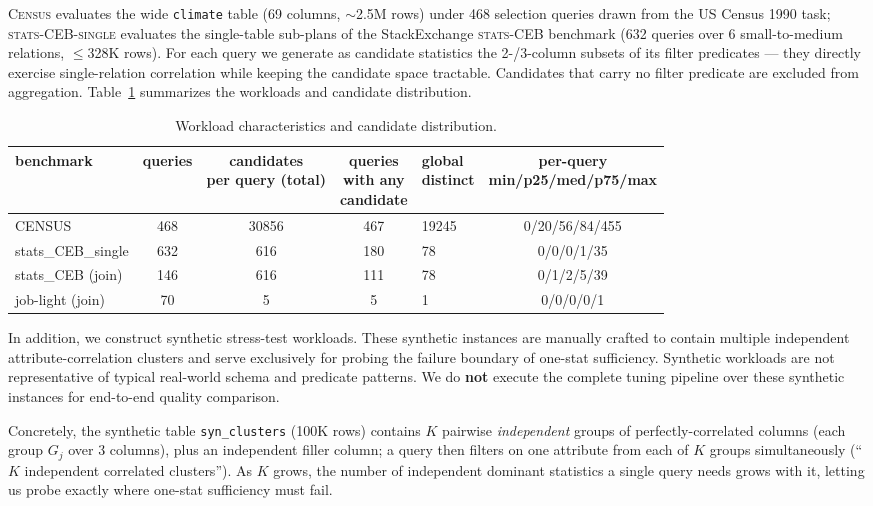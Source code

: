 \documentclass[sigconf, nonacm]{acmart}
\begin{document}
\textsc{Census} evaluates the wide \texttt{climate} table (69 columns,
$\sim$2.5M rows) under 468 selection queries drawn from the US Census 1990 task;
\textsc{stats-CEB-single} evaluates the single-table sub-plans of the
StackExchange \textsc{stats-CEB} benchmark (632 queries over 6 small-to-medium
relations, $\le$328K rows). For each query we generate as candidate statistics
the 2-/3-column subsets of its filter predicates --- they directly exercise
single-relation correlation while keeping the candidate space tractable.
Candidates that carry no filter predicate are excluded from aggregation.
Table~\ref{tab:bench} summarizes the workloads and candidate distribution.

\begin{table}[t]
\caption{Workload characteristics and candidate distribution.}
\label{tab:bench}
\small
\begin{tabular}{lcccl@{\hskip 3pt}c}
\toprule
benchmark & queries & \shortstack[c]{candidates\\per query (total)} & \shortstack[c]{queries\\with any\\candidate} & \shortstack[c]{global\\distinct} & \shortstack[c]{per-query\\min/p25/med/p75/max} \\
\midrule
CENSUS            & 468 & 30856 & 467 & 19245 & 0/20/56/84/455\\
stats\_CEB\_single & 632 & 616   & 180 & 78    & 0/0/0/1/35\\
stats\_CEB (join) & 146 & 616   & 111 & 78    & 0/1/2/5/39\\
job-light (join)  & 70  & 5     & 5   & 1     & 0/0/0/0/1\\
\bottomrule
\end{tabular}
\end{table}

In addition, we construct synthetic stress-test workloads. These synthetic instances are manually crafted to contain multiple independent attribute-correlation clusters and serve exclusively for probing the failure boundary of one-stat sufficiency.
Synthetic workloads are not representative of typical real-world schema and predicate patterns.
We do \textbf{not} execute the complete tuning pipeline over these synthetic instances for end-to-end quality comparison.

Concretely, the synthetic table \texttt{syn\_clusters} (100K rows) contains
$K$ pairwise \emph{independent} groups of perfectly-correlated columns (each
group $G_j$ over 3 columns), plus an independent filler column; a query then
filters on one attribute from each of $K$ groups simultaneously (``$K$
independent correlated clusters''). As $K$ grows, the number of independent
dominant statistics a single query needs grows with it, letting us probe
exactly where one-stat sufficiency must fail.
\end{document}
